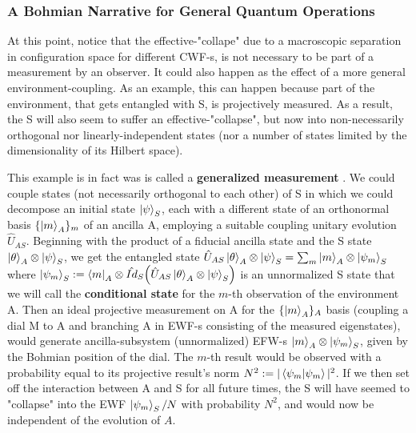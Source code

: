 \documentclass[11pt, a4paper]{article} %
\begin{document}
\subsubsection*{A Bohmian Narrative for General Quantum Operations}
At this point, notice that the effective-"collape" due to a macroscopic separation in configuration space for different CWF-s, is not necessary to be part of a measurement by an observer. It could also happen as the effect of a more general environment-coupling. 
As an example, this can happen because part of the environment, that gets entangled with S, is projectively measured. As a result, the S will also seem to suffer an effective-"collapse", but now into non-necessarily orthogonal nor linearly-independent states (nor a number of states limited by the dimensionality of its Hilbert space). 

This example is in fact was is called a {\bf generalized measurement} \cite{Generalized, Durr}. We could couple states (not necessarily orthogonal to each other) of S in which we could decompose an initial state $\ket{\psi}_S$, each with a different state of an orthonormal basis $\{\ket{m}_A\}_m$ of an ancilla A, employing a suitable coupling unitary evolution $\hat{U}_{AS}$. Beginning with the product of a fiducial ancilla state and the S state $\ket{\theta}_A\otimes\ket{\psi}_S$, we get the entangled state $\hat{U}_{AS}\ket{\theta}_A\otimes\ket{\psi}_S=\sum_m \ket{m}_A\otimes \ket{\psi_m}_S$ where $\ket{\psi_m}_S:=\bra{m}_A\otimes\hat{Id}_S \qty(\hat{U}_{AS}\ket{\theta}_A\otimes\ket{\psi}_S)$ is an unnormalized S state that we will call the {\bf conditional state} for the $m$-th observation of the environment A. Then an ideal projective measurement on A for the $\{\ket{m}_A\}_A$ basis (coupling a dial M to A and branching A in EWF-s consisting of the measured eigenstates), would generate ancilla-subsystem (unnormalized) EFW-s $\ket{m}_A\otimes \ket{\psi_m}_S$, given by the Bohmian position of the dial. The $m$-th result would be observed with a probability equal to its projective result's norm $N^2:=|\bra{\psi_m}\ket{\psi_m}|^2$. If we then set off the interaction between A and S for all future times, the S will have seemed to "collapse" into the EWF $\ket{\psi_m}_S/N$ with probability $N^2$, and would now be independent of the evolution of $A$.
\end{document}
